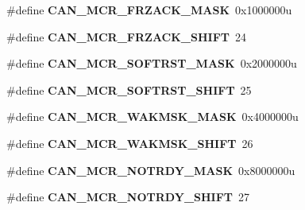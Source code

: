 \begin{DoxyCompactItemize}
\item 
\hypertarget{group___c_a_n___register___masks_gabec15eb427d7b249e72902c35bfc5f6e}{}\#define {\bfseries C\+A\+N\+\_\+\+M\+C\+R\+\_\+\+F\+R\+Z\+A\+C\+K\+\_\+\+M\+A\+S\+K}~0x1000000u\label{group___c_a_n___register___masks_gabec15eb427d7b249e72902c35bfc5f6e}

\item 
\hypertarget{group___c_a_n___register___masks_ga666c7d11b911c7803d94b85ba54a05c3}{}\#define {\bfseries C\+A\+N\+\_\+\+M\+C\+R\+\_\+\+F\+R\+Z\+A\+C\+K\+\_\+\+S\+H\+I\+F\+T}~24\label{group___c_a_n___register___masks_ga666c7d11b911c7803d94b85ba54a05c3}

\item 
\hypertarget{group___c_a_n___register___masks_gab9b1cfdb7014655d12f0a5ebafb3fc9b}{}\#define {\bfseries C\+A\+N\+\_\+\+M\+C\+R\+\_\+\+S\+O\+F\+T\+R\+S\+T\+\_\+\+M\+A\+S\+K}~0x2000000u\label{group___c_a_n___register___masks_gab9b1cfdb7014655d12f0a5ebafb3fc9b}

\item 
\hypertarget{group___c_a_n___register___masks_gadff8b8b1d5645fca57a02109df3e507b}{}\#define {\bfseries C\+A\+N\+\_\+\+M\+C\+R\+\_\+\+S\+O\+F\+T\+R\+S\+T\+\_\+\+S\+H\+I\+F\+T}~25\label{group___c_a_n___register___masks_gadff8b8b1d5645fca57a02109df3e507b}

\item 
\hypertarget{group___c_a_n___register___masks_gac42f66e8828cd1923fee14d23ed99986}{}\#define {\bfseries C\+A\+N\+\_\+\+M\+C\+R\+\_\+\+W\+A\+K\+M\+S\+K\+\_\+\+M\+A\+S\+K}~0x4000000u\label{group___c_a_n___register___masks_gac42f66e8828cd1923fee14d23ed99986}

\item 
\hypertarget{group___c_a_n___register___masks_gac10449abdadabddb4aef81457dfb7449}{}\#define {\bfseries C\+A\+N\+\_\+\+M\+C\+R\+\_\+\+W\+A\+K\+M\+S\+K\+\_\+\+S\+H\+I\+F\+T}~26\label{group___c_a_n___register___masks_gac10449abdadabddb4aef81457dfb7449}

\item 
\hypertarget{group___c_a_n___register___masks_ga013a34c0c5b808052d13ed4b9db2af75}{}\#define {\bfseries C\+A\+N\+\_\+\+M\+C\+R\+\_\+\+N\+O\+T\+R\+D\+Y\+\_\+\+M\+A\+S\+K}~0x8000000u\label{group___c_a_n___register___masks_ga013a34c0c5b808052d13ed4b9db2af75}

\item 
\hypertarget{group___c_a_n___register___masks_ga90886e532a436fbd5b6e94e723acd148}{}\#define {\bfseries C\+A\+N\+\_\+\+M\+C\+R\+\_\+\+N\+O\+T\+R\+D\+Y\+\_\+\+S\+H\+I\+F\+T}~27\label{group___c_a_n___register___masks_ga90886e532a436fbd5b6e94e723acd148}


\end{DoxyCompactItemize}
